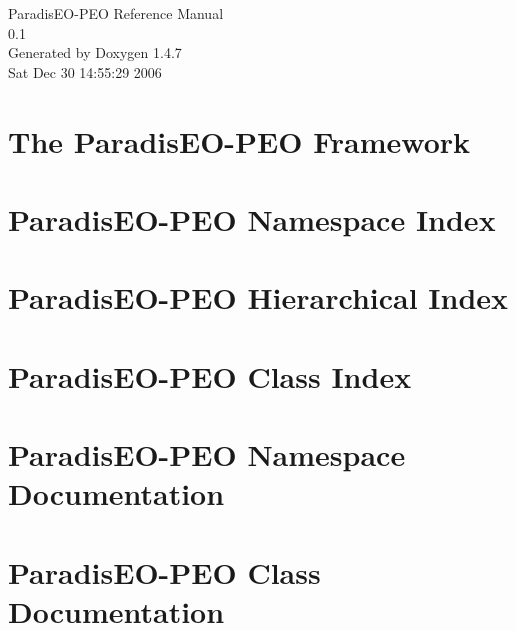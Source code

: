 \documentclass[a4paper]{book}
\begin{document}
\begin{titlepage}
\vspace*{7cm}
\begin{center}
{\Large Paradis\-EO-PEO Reference Manual\\[1ex]\large 0.1 }\\
\vspace*{1cm}
{\large Generated by Doxygen 1.4.7}\\
\vspace*{0.5cm}
{\small Sat Dec 30 14:55:29 2006}\\
\end{center}
\end{titlepage}
\clearemptydoublepage
{}
\tableofcontents
\clearemptydoublepage
{}
\chapter{The Paradis\-EO-PEO Framework }
\label{index}\hypertarget{index}{}
\chapter{Paradis\-EO-PEO Namespace Index}

\chapter{Paradis\-EO-PEO Hierarchical Index}

\chapter{Paradis\-EO-PEO Class Index}

\chapter{Paradis\-EO-PEO Namespace Documentation}

\chapter{Paradis\-EO-PEO Class Documentation}
























\printindex
\end{document}
